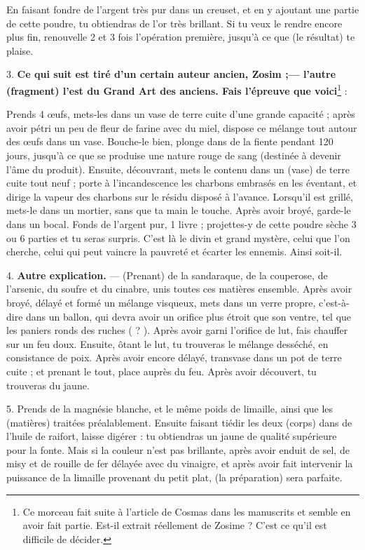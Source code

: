 \documentclass[a4paper, 11pt, oneside, polutonikogreek, french]{article}
\begin{document}
En faisant fondre de l'argent très pur dans un creuset, et en y ajoutant une partie de cette poudre, tu obtiendras de l'or très brillant. Si tu veux le rendre encore plus fin, renouvelle 2 et 3 fois l'opération première, jusqu'à ce que (le résultat) te plaise.

3. \textbf{Ce qui suit est tiré d'un certain auteur ancien, Zosim ;--- l'autre (fragment) l'est du Grand Art des anciens. Fais l'épreuve que voici}\footnote{Ce morceau fait suite à l'article de Cosmas dans les manuscrits et semble en avoir fait partie. Est-il extrait réellement de Zosime ? C'est ce qu'il est difficile de décider.} :

Prends 4 œufs, mets-les dans un vase de terre cuite d'une grande capacité ; après avoir pétri un peu de fleur de farine avec du miel, dispose ce mélange tout autour des œufs dans un vase. Bouche-le bien, plonge dans de la fiente pendant 120 jours, jusqu'à ce que se produise une nature rouge de sang (destinée à devenir l'âme du produit). Ensuite, découvrant, mets le contenu dans un (vase) de terre cuite tout neuf ; porte à l'incandescence les charbons embrasés en les éventant, et dirige la vapeur des charbons sur le résidu disposé à l'avance. Lorsqu'il est grillé, mets-le dans un mortier, sans que ta main le touche. Après avoir broyé, garde-le dans un bocal. Fonds de l'argent pur, 1 livre ; projettes-y de cette poudre sèche 3 ou 6 parties et tu seras surpris. C'est là le divin et grand mystère, celui que l'on cherche, celui qui peut vaincre la pauvreté et écarter les ennemis. Ainsi soit-il.

4. \textbf{Autre explication.} --- (Prenant) de la sandaraque, de la couperose, de l'arsenic, du soufre et du cinabre, unis toutes ces matières ensemble. Après avoir broyé, délayé et formé un mélange visqueux, mets dans un verre propre, c'est-à-dire dans un ballon, qui devra avoir un orifice plus étroit que son ventre, tel que les paniers ronds des ruches ( ? ). Après avoir garni l'orifice de lut, fais chauffer sur un feu doux. Ensuite, ôtant le lut, tu trouveras le mélange desséché, en consistance de poix. Après avoir encore délayé, transvase dans un pot de terre cuite ; et prenant le tout, place auprès du feu. Après avoir découvert, tu trouveras du jaune.

5. Prends de la magnésie blanche, et le même poids de limaille, ainsi que les (matières) traitées préalablement. Ensuite faisant tiédir les deux (corps) dans de l'huile de raifort, laisse digérer : tu obtiendras un jaune de qualité supérieure pour la fonte. Mais si la couleur n'est pas brillante, après avoir enduit de sel, de misy et de rouille de fer délayée avec du vinaigre, et après avoir fait intervenir la puissance de la limaille provenant du petit plat, (la préparation) sera parfaite.
\end{document}
